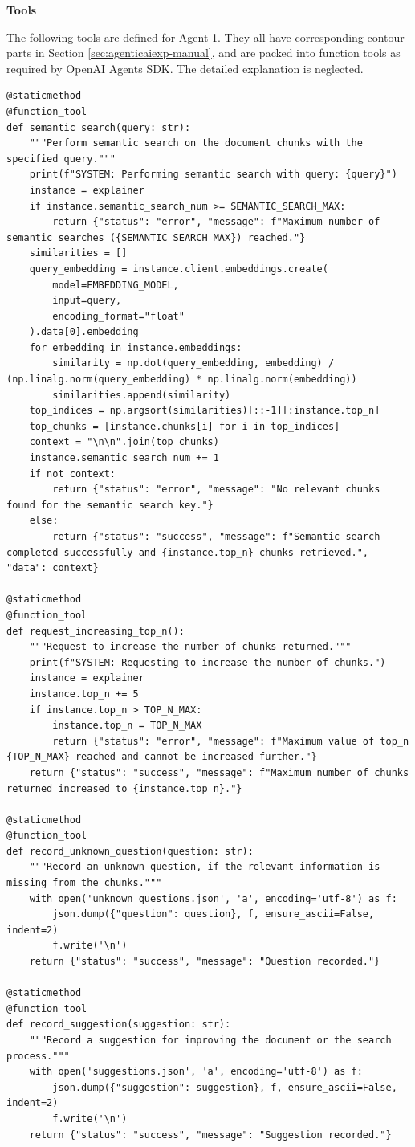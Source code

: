 \vspace{0.1in}
\noindent \textbf{Tools}
\vspace{0.1in}

The following tools are defined for Agent 1. They all have corresponding contour parts in Section \ref{sec:agenticaiexp-manual}, and are packed into function tools as required by OpenAI Agents SDK. The detailed explanation is neglected.

\begin{lstlisting}
@staticmethod
@function_tool
def semantic_search(query: str):
    """Perform semantic search on the document chunks with the specified query."""
    print(f"SYSTEM: Performing semantic search with query: {query}")
    instance = explainer
    if instance.semantic_search_num >= SEMANTIC_SEARCH_MAX:
        return {"status": "error", "message": f"Maximum number of semantic searches ({SEMANTIC_SEARCH_MAX}) reached."}
    similarities = []
    query_embedding = instance.client.embeddings.create(
        model=EMBEDDING_MODEL,
        input=query,
        encoding_format="float"
    ).data[0].embedding
    for embedding in instance.embeddings:
        similarity = np.dot(query_embedding, embedding) / (np.linalg.norm(query_embedding) * np.linalg.norm(embedding))
        similarities.append(similarity)
    top_indices = np.argsort(similarities)[::-1][:instance.top_n]
    top_chunks = [instance.chunks[i] for i in top_indices]
    context = "\n\n".join(top_chunks)
    instance.semantic_search_num += 1
    if not context:
        return {"status": "error", "message": "No relevant chunks found for the semantic search key."}
    else:
        return {"status": "success", "message": f"Semantic search completed successfully and {instance.top_n} chunks retrieved.", "data": context}
    
@staticmethod
@function_tool
def request_increasing_top_n():
    """Request to increase the number of chunks returned."""
    print(f"SYSTEM: Requesting to increase the number of chunks.")
    instance = explainer
    instance.top_n += 5
    if instance.top_n > TOP_N_MAX:
        instance.top_n = TOP_N_MAX
        return {"status": "error", "message": f"Maximum value of top_n {TOP_N_MAX} reached and cannot be increased further."}
    return {"status": "success", "message": f"Maximum number of chunks returned increased to {instance.top_n}."}

@staticmethod
@function_tool
def record_unknown_question(question: str):
    """Record an unknown question, if the relevant information is missing from the chunks."""
    with open('unknown_questions.json', 'a', encoding='utf-8') as f:
        json.dump({"question": question}, f, ensure_ascii=False, indent=2)
        f.write('\n')
    return {"status": "success", "message": "Question recorded."}

@staticmethod
@function_tool
def record_suggestion(suggestion: str):
    """Record a suggestion for improving the document or the search process."""
    with open('suggestions.json', 'a', encoding='utf-8') as f:
        json.dump({"suggestion": suggestion}, f, ensure_ascii=False, indent=2)
        f.write('\n')
    return {"status": "success", "message": "Suggestion recorded."}
\end{lstlisting}


